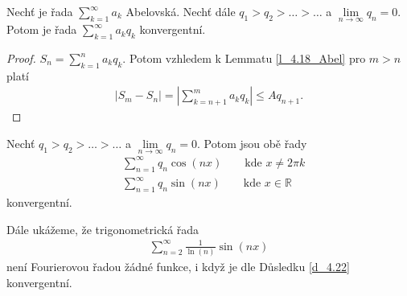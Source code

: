 \begin{theorem}\label{v_4.21}
Nechť je řada $\sum \limits _{k=1}^{\infty} a_k$ Abelovská. Nechť dále $ q_1 > q_2 > \ldots > \ldots$ a $\lim \limits _{n \rightarrow \infty} q_n = 0$. Potom je řada $\sum \limits _{k=1}^\infty a_k q_k$ konvergentní.
\begin{proof}
$S_n = \sum \limits _{k=1}^n a_k q_k$. Potom vzhledem k Lemmatu \ref{l_4.18_Abel} pro $m > n$ platí
\begin{align*}
|S_m - S_n| = \left| \sum \limits _{k = n + 1}^m a_k q_k \right| \leq A q_{n+1}.
\end{align*}
\end{proof}
\end{theorem}

\begin{dusledek}\label{d_4.22}
Nechť $ q_1 > q_2 > \ldots > \ldots$ a $\lim \limits _{n \rightarrow \infty} q_n = 0$. Potom jsou obě řady
\begin{align*}
&\sum \limits _{n=1}^\infty q_n \cos (nx) \qquad \text{kde $x \neq 2 \pi k$} \\
&\sum \limits _{n=1}^{\infty} q_n \sin (nx)\qquad \text{kde $x \in \mathbb{R}$} 
\end{align*} 
konvergentní. 
\end{dusledek}

Dále ukážeme, že trigonometrická řada
\begin{align}\label{vztah_4.26}
\sum \limits _{n=2}^{\infty} \frac{1}{\ln(n)} \sin (nx)
\end{align}
není Fourierovou řadou žádné funkce, i když je dle Důsledku \ref{d_4.22} konvergentní.

